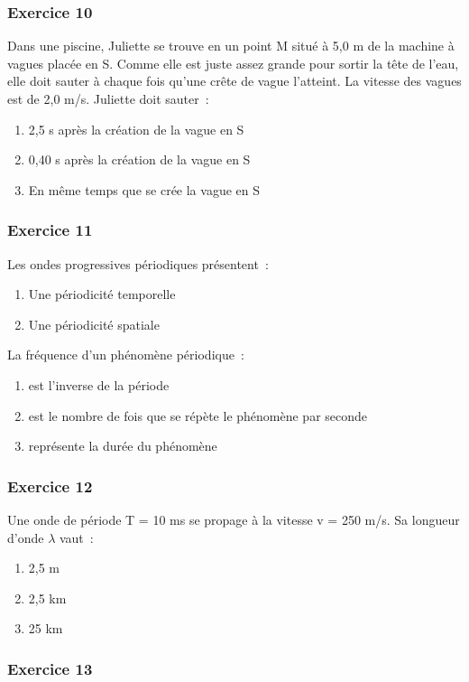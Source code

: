 \begin{multicols}{2}
\subsubsection*{Exercice 10}
  Dans une piscine, Juliette se trouve en un point M situé à 5,0
  m de la machine à vagues placée en S. Comme elle est juste assez
  grande pour sortir la tête de l'eau, elle doit sauter à chaque fois
  qu'une crête de vague l'atteint. La vitesse des vagues est de 2,0 m/s.
  Juliette doit sauter~: 
\begin{enumerate}
\item
  2,5 s après la création de la vague en S
\item
  0,40 s après la création de la vague en S
\item
  En même temps que se crée la vague en S
\end{enumerate}

\subsubsection*{Exercice 11}
Les ondes progressives périodiques présentent~: 
\begin{enumerate}
\item  Une périodicité temporelle
\item  Une périodicité spatiale
\end{enumerate}
La fréquence d'un phénomène périodique~: 
\begin{enumerate}
\item est l'inverse de la période
\item est le nombre de fois que se répète le phénomène par seconde
\item représente la durée du phénomène
\end{enumerate}


\subsubsection*{Exercice 12}

Une onde de période T = 10 ms se propage à la vitesse v = 250 \si{ m/s}. Sa longueur d'onde $\lambda$ vaut~: 
\begin{enumerate}
\item  2,5 \si{m}
\item
  2,5 km
\item
  25 km
\end{enumerate}

\subsubsection*{Exercice 13}


\end{multicols}
